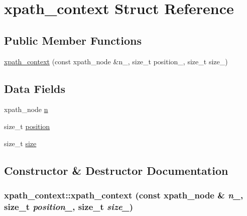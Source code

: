 \hypertarget{structxpath__context}{
\section{xpath\_\-context Struct Reference}
\label{structxpath__context}
}
\subsection*{Public Member Functions}
\begin{DoxyCompactItemize}
\item 
\hyperlink{structxpath__context_ab5d7a8d5a14ef695b93e15cfb0e20386}{xpath\_\-context} (const xpath\_\-node \&n\_\-, size\_\-t position\_\-, size\_\-t size\_\-)
\end{DoxyCompactItemize}
\subsection*{Data Fields}
\begin{DoxyCompactItemize}
\item 
xpath\_\-node \hyperlink{structxpath__context_ace8fbb8121820bc5054605c166101273}{n}
\item 
size\_\-t \hyperlink{structxpath__context_add1fc9bd16b21d3a8d7a4bd63c60af07}{position}
\item 
size\_\-t \hyperlink{structxpath__context_a976ffb0eff84a7779c97e589c1785d1c}{size}
\end{DoxyCompactItemize}


\subsection{Constructor \& Destructor Documentation}
\hypertarget{structxpath__context_ab5d7a8d5a14ef695b93e15cfb0e20386}{
\subsubsection[{xpath\_\-context}]{\setlength{\rightskip}{0pt plus 5cm}xpath\_\-context::xpath\_\-context (const xpath\_\-node \& {\em n\_\-}, \/  size\_\-t {\em position\_\-}, \/  size\_\-t {\em size\_\-})}}
\label{structxpath__context_ab5d7a8d5a14ef695b93e15cfb0e20386}


